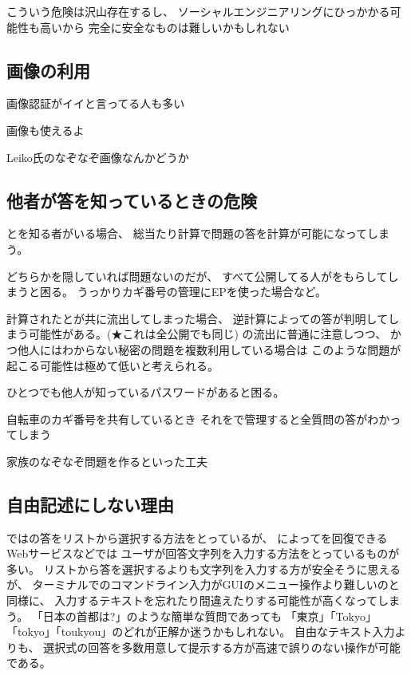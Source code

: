 \documentclass[twoside]{wiss}
\begin{document}
こういう危険は沢山存在するし、
ソーシャルエンジニアリング\cite{ソーシャル}にひっかかる可能性も高いから
完全に安全なものは難しいかもしれない


\subsection{画像の利用}

画像認証がイイと言ってる人も多い

画像も使えるよ

Leiko氏のなぞなぞ画像なんかどうか

\subsection{他者が答を知っているときの危険}


{\PW}と{\SS}を知る者がいる場合、
総当たり計算で問題の答を計算が可能になってしまう。

どちらかを隠していれば問題ないのだが、
すべて公開してる人が{\PW}をもらしてしまうと困る。
うっかりカギ番号の管理にEPを使った場合など。


計算された{\PW}と{\SS}が共に流出してしまった場合、
逆計算によって{\SQ}の答が判明してしまう可能性がある。(★これは全公開でも同じ)
{\PW}の流出に普通に注意しつつ、
かつ他人にはわからない秘密の問題を複数利用している場合は
このような問題が起こる可能性は極めて低いと考えられる。

ひとつでも他人が知っているパスワードがあると困る。

自転車のカギ番号を共有しているとき
それを{\EP}で管理すると全質問の答がわかってしまう

家族のなぞなぞ問題を作るといった工夫

\subsection{自由記述にしない理由}

{\EP}では{\SQ}の答をリストから選択する方法をとっているが、
{\SQ}によって{\PW}を回復できるWebサービスなどでは
ユーザが回答文字列を入力する方法をとっているものが多い。
リストから答を選択するよりも文字列を入力する方が安全そうに思えるが、
ターミナルでのコマンドライン入力がGUIのメニュー操作より難しいのと同様に、
入力するテキストを忘れたり間違えたりする可能性が高くなってしまう。
「日本の首都は?」のような簡単な質問であっても
「東京」「Tokyo」「tokyo」「toukyou」のどれが正解か迷うかもしれない。
自由なテキスト入力よりも、
選択式の回答を多数用意して提示する方が高速で誤りのない操作が可能である。
\end{document}
